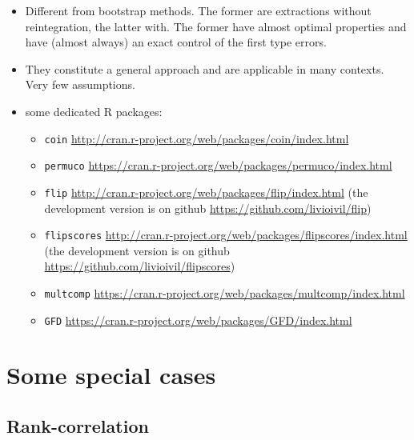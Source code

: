 \documentclass[
]{article}
\providecommand{\tightlist}{%
  \setlength{\itemsep}{0pt}\setlength{\parskip}{0pt}}
\begin{document}
\begin{itemize}
\tightlist
\item
  Different from bootstrap methods. The former are extractions without
  reintegration, the latter with. The former have almost optimal
  properties and have (almost always) an exact control of the first type
  errors.
\item
  They constitute a general approach and are applicable in many
  contexts. Very few assumptions.\\
\item
  some dedicated R packages:

  \begin{itemize}
  \tightlist
  \item
    \texttt{coin}
    \url{http://cran.r-project.org/web/packages/coin/index.html}
  \item
    \texttt{permuco}
    \url{https://cran.r-project.org/web/packages/permuco/index.html}
  \item
    \texttt{flip}
    \url{http://cran.r-project.org/web/packages/flip/index.html} (the
    development version is on github
    \url{https://github.com/livioivil/flip})
  \item
    \texttt{flipscores}
    \url{http://cran.r-project.org/web/packages/flipscores/index.html}
    (the development version is on github
    \url{https://github.com/livioivil/flipscores})
  \item
    \texttt{multcomp}
    \url{https://cran.r-project.org/web/packages/multcomp/index.html}
  \item
    \texttt{GFD}
    \url{https://cran.r-project.org/web/packages/GFD/index.html}
  \end{itemize}
\end{itemize}

\hypertarget{some-special-cases}{%
\section{Some special cases}\label{some-special-cases}}

\hypertarget{rank-correlation}{%
\subsection{Rank-correlation}\label{rank-correlation}}
\end{document}
